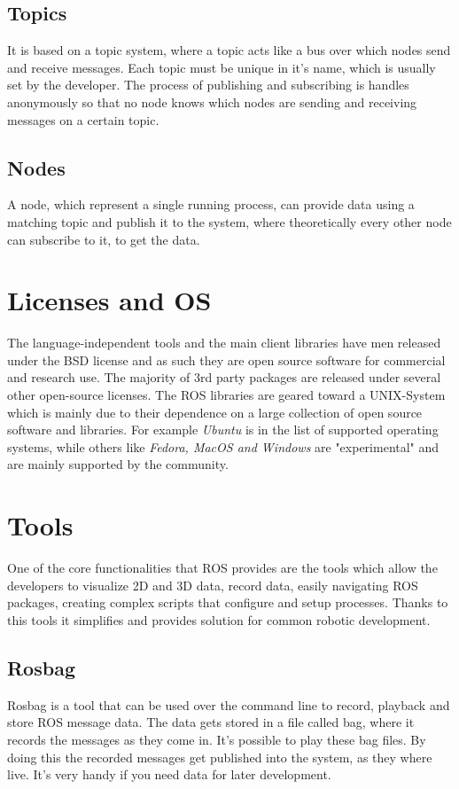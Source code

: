 \subsection{Topics}
It is based on a topic system, where a topic acts like a bus over which nodes send and receive messages. Each topic must be unique in it's name, which is usually set by the developer. The process of publishing and subscribing is handles anonymously so that no node knows which nodes are sending and receiving messages on a certain topic.

\subsection{Nodes}
A node, which represent a single running process, can provide data using a matching topic and publish it to the system, where theoretically every other node can subscribe to it, to get the data. 

\section{Licenses and OS}
The language-independent tools and the main client libraries have men released under the BSD license and as such they are open source software for commercial and research use. The majority of 3rd party packages are released under several other open-source licenses.\newline
The ROS libraries are geared toward a UNIX-System which is mainly due to their dependence on a large collection of open source software and libraries.
For example \textit{Ubuntu} is in the list of supported operating systems, while others like \textit{Fedora, MacOS and Windows} are "experimental" and are mainly supported by the community.

\section{Tools}
One of the core functionalities that ROS provides are the tools which allow the developers to visualize 2D and 3D data, record data, easily navigating ROS packages, creating complex scripts that configure and setup processes. Thanks to this tools it simplifies and provides solution for common robotic development.

\subsection{Rosbag}
Rosbag is a tool that can be used over the command line to record, playback and store ROS message data. The data gets stored in a file called bag, where it records the messages as they come in. It's possible to play these bag files. By doing this the recorded messages get published into the system, as they where live. It's very handy if you need data for later development.

